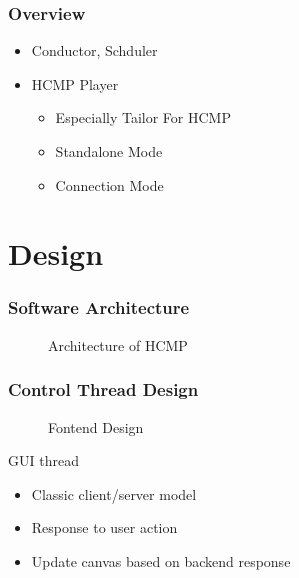\documentclass[t]{beamer}
\begin{document}
\begin{frame}
\frametitle{Overview}

  \begin{itemize}
    \item Conductor, Schduler 
    \item HCMP Player 
        \begin{itemize}
          \item Especially Tailor For HCMP 
          \item Standalone Mode
          \item Connection Mode 
        \end{itemize}
  \end{itemize}
\end{frame}

\section{Design}

\begin{frame}
\frametitle{Software Architecture}
\begin{figure}[H] %
\caption{Architecture of HCMP}
\label{fig:speciation}
\end{figure}
\end{frame}

\begin{frame}
\frametitle{Control Thread Design}
\begin{figure}[H] %
\caption{Fontend Design}
\label{fig:speciation}
\end{figure}
GUI thread 
  \begin{itemize}
    \item Classic client/server model
    \item Response to user action 
    \item Update canvas based on backend response  
  \end{itemize}

\end{frame}
\end{document}
